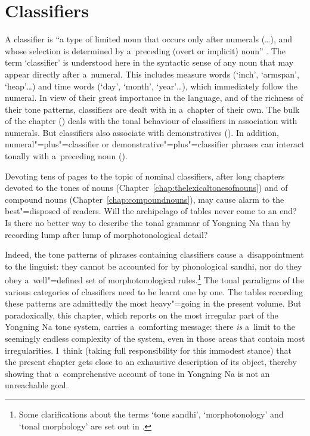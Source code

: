 \chapter{Classifiers}
\label{chap:classifiers}


A classifier  is “a type of limited noun that occurs only after numerals ({\dots}), and whose
selection is determined by a~preceding (overt or implicit) noun”
\citep[88]{matisoff1973a}. The term ‘classifier’ is understood here in the
syntactic sense of any noun that may appear directly after
a~numeral. This includes measure words (‘inch', ‘armspan', ‘heap'{\dots}) and time words (‘day',
‘month', ‘year'{\dots}), which immediately follow the numeral. In view of their great importance in the language, and of the richness of their tone patterns, classifiers are dealt with in a~chapter of their own. The bulk of the chapter () deals with the tonal behaviour of classifiers in association with numerals. But classifiers
also associate with demonstratives (). In addition, numeral"=plus"=classifier or
demonstrative"=plus"=classifier phrases can interact tonally with a~preceding noun ().

Devoting tens of pages to the topic of nominal classifiers, after long chapters devoted to the tones of nouns (Chapter~\ref{chap:thelexicaltonesofnouns}) and of compound nouns (Chapter~\ref{chap:compoundnouns}), may cause alarm to the best"=disposed of readers. Will the archipelago of tables never come to an end?
Is there no better way to describe the tonal grammar of Yongning Na than by recording lump after lump of morphotonological detail?

Indeed, the tone patterns of phrases containing classifiers cause a~disappointment to the linguist: they cannot be accounted for by phonological sandhi, nor do they obey a~well"=defined set of morphotonological rules.\footnote{Some clarifications about the terms ‘{tone sandhi}’, ‘morphotonology’ and ‘tonal morphology’ are set out in .} The tonal paradigms of the various categories of classifiers need to be learnt one by one. The tables recording these patterns are admittedly the most heavy"=going in the present volume. But paradoxically, this chapter, which reports on the most irregular part of the Yongning Na tone system, carries a~comforting message: there \textit{is} a~limit to the seemingly endless complexity of the system, even in those areas that contain most irregularities. I~think (taking full responsibility for this immodest stance) that the present chapter gets close to an exhaustive description of its object, thereby showing that a~comprehensive account of tone in Yongning Na is not an unreachable goal.

